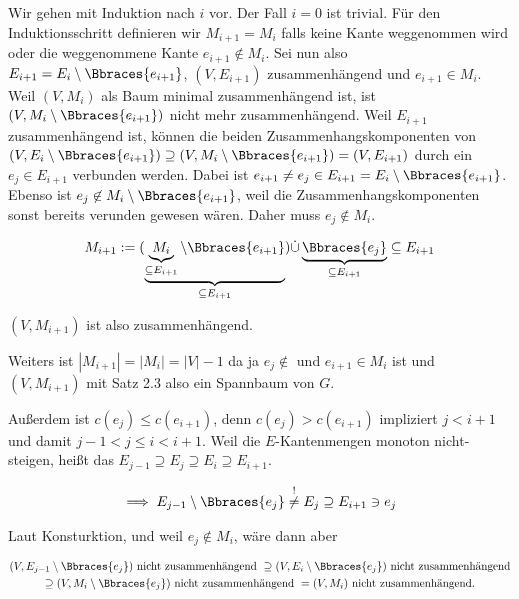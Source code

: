 \begin{solution}
\begin{enumerate}[label = (\Alph*)]
    Wir gehen mit Induktion nach $i$ vor.
    Der Fall $i = 0$ ist trivial.
    Für den Induktionsschritt definieren wir $M_{i+1} = M_i$ falls keine Kante weggenommen wird oder die weggenommene Kante $e_{i+1} \not \in M_i$.
    Sei nun also $E_{i+1} = E_i \setminus \Bbraces{e_{i+1}}$, $(V, E_{i+1})$ zusammenhängend und $e_{i+1} \in M_i$.
    Weil $(V, M_i)$ als Baum minimal zusammenhängend ist, ist $(V, M_i \setminus \Bbraces{e_{i+1}})$ nicht mehr zusammenhängend.
    Weil $E_{i+1}$ zusammenhängend ist, können die beiden Zusammenhangskomponenten von $(V, E_i \setminus \Bbraces{e_{i+1}}) \supseteq (V, M_i \setminus \Bbraces{e_{i+1}}) = (V, E_{i+1})$ durch ein $e_j \in E_{i+1}$ verbunden werden.
    Dabei ist $e_{i+1} \neq e_j \in E_{i+1} = E_i \setminus \Bbraces{e_{i+1}}$.
    Ebenso ist $e_j \not \in M_i \setminus \Bbraces{e_{i+1}}$, weil die Zusammenhangskomponenten sonst bereits verunden gewesen wären.
    Daher muss $e_j \not \in M_i$.

    \begin{align*}
        M_{i+1}
        :=
        (
            \underbrace
            {
                \underbrace{M_i}_{\subseteq E_{i+1}}
                \setminus
                \Bbraces{e_{i+1}}
            }_{
                \subseteq E_{i+1}
            }
        )
        \dot \cup
        \underbrace
        {
            \Bbraces{e_j}
        }_{
            \subseteq E_{i+1}
        }
        \subseteq
        E_{i+1}
    \end{align*}

    $(V, M_{i+1})$ ist also zusammenhängend.

    Weiters ist $|M_{i+1}| = |M_i| = |V| - 1$ da ja $e_j \not \in$ und $e_{i+1} \in M_i$ ist und $(V, M_{i+1})$ mit Satz 2.3 also ein Spannbaum von $G$.

    Außerdem ist $c(e_j) \leq c(e_{i+1})$, denn $c(e_j) > c(e_{i+1})$ impliziert $j < i + 1$ und damit $j-1 < j \leq i < i+1$.
    Weil die $E$-Kantenmengen monoton nicht-steigen, heißt das $E_{j-1} \supseteq E_j \supseteq E_i \supseteq E_{i+1}$.

    \begin{align*}
        \implies
        E_{j-1} \setminus \Bbraces{e_j}
        \stackrel{!}{\neq}
        E_j
        \supseteq
        E_{i+1}
        \ni
        e_j
    \end{align*}

    Laut Konsturktion, und weil $e_j \not \in M_i$, wäre dann aber

    \begin{multline*}
        (V, E_{j-1} \setminus \Bbraces{e_j}) ~\text{nicht zusammenhängend}~
        \supseteq
        (V, E_i     \setminus \Bbraces{e_j}) ~\text{nicht zusammenhängend} \\
        \supseteq
        (V, M_i     \setminus \Bbraces{e_j}) ~\text{nicht zusammenhängend}~
        =
        (V, M_i)                             ~\text{nicht zusammenhängend.}
    \end{multline*}


\end{enumerate}
\end{solution}
